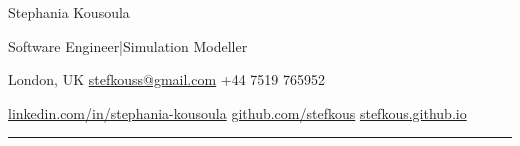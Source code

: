 \documentclass[10pt,a4paper]{article}
\begin{document}
{\fontsize{25}{29}\selectfont Stephania Kousoula}\par
{\large\color{teal}Software Engineer\quad|\quad Simulation Modeller}\par
{\small\color{muted}London, UK\quad\textbullet\quad
\href{mailto:stefkouss@gmail.com}{stefkouss@gmail.com}\quad\textbullet\quad
+44 7519 765952}\par
{\footnotesize\color{muted}
\href{https://www.linkedin.com/in/stephania-kousoula/}{linkedin.com/in/stephania-kousoula}
\quad\textbullet\quad \href{https://github.com/stefkous}{github.com/stefkous}
\quad\textbullet\quad \href{https://stefkous.github.io}{stefkous.github.io}}\par
\vspace{4pt}\hrule\vspace{4pt}
\end{document}
